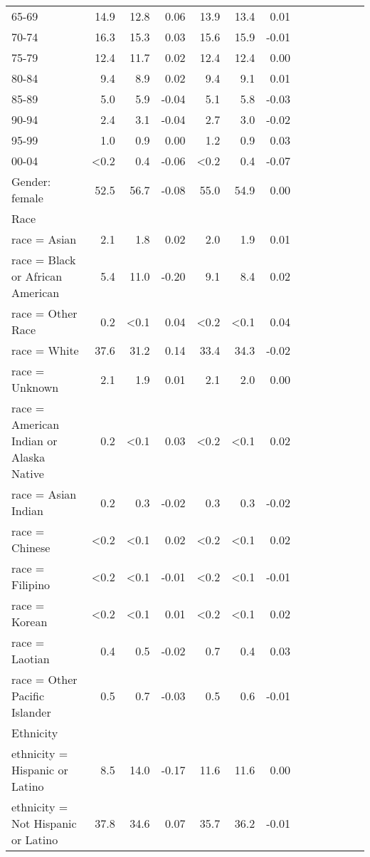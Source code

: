 \documentclass[11pt,]{article}
\begin{document}
\begin{longtable}{lrrrrrrrrrrrr}
      65-69 & 14.9 & 12.8 &  0.06 & 13.9 & 13.4 &  0.01 \\ 
      70-74 & 16.3 & 15.3 &  0.03 & 15.6 & 15.9 & -0.01 \\ 
      75-79 & 12.4 & 11.7 &  0.02 & 12.4 & 12.4 &  0.00 \\ 
      80-84 &  9.4 &  8.9 &  0.02 &  9.4 &  9.1 &  0.01 \\ 
      85-89 &  5.0 &  5.9 & -0.04 &  5.1 &  5.8 & -0.03 \\ 
      90-94 &  2.4 &  3.1 & -0.04 &  2.7 &  3.0 & -0.02 \\ 
      95-99 &  1.0 &  0.9 &  0.00 &  1.2 &  0.9 &  0.03 \\ 
      00-04 & <0.2 &  0.4 & -0.06 & <0.2 &  0.4 & -0.07 \\ 
  Gender: female & 52.5 & 56.7 & -0.08 & 55.0 & 54.9 &  0.00 \\ 
  Race &    &    &     &    &    &     \\ 
      race = Asian &  2.1 &  1.8 &  0.02 &  2.0 &  1.9 &  0.01 \\ 
      race = Black or African American &  5.4 & 11.0 & -0.20 &  9.1 &  8.4 &  0.02 \\ 
      race = Other Race &  0.2 & <0.1 &  0.04 & <0.2 & <0.1 &  0.04 \\ 
      race = White & 37.6 & 31.2 &  0.14 & 33.4 & 34.3 & -0.02 \\ 
      race = Unknown &  2.1 &  1.9 &  0.01 &  2.1 &  2.0 &  0.00 \\ 
      race = American Indian or Alaska Native &  0.2 & <0.1 &  0.03 & <0.2 & <0.1 &  0.02 \\ 
      race = Asian Indian &  0.2 &  0.3 & -0.02 &  0.3 &  0.3 & -0.02 \\ 
      race = Chinese & <0.2 & <0.1 &  0.02 & <0.2 & <0.1 &  0.02 \\ 
      race = Filipino & <0.2 & <0.1 & -0.01 & <0.2 & <0.1 & -0.01 \\ 
      race = Korean & <0.2 & <0.1 &  0.01 & <0.2 & <0.1 &  0.02 \\ 
      race = Laotian &  0.4 &  0.5 & -0.02 &  0.7 &  0.4 &  0.03 \\ 
      race = Other Pacific Islander &  0.5 &  0.7 & -0.03 &  0.5 &  0.6 & -0.01 \\ 
  Ethnicity &    &    &     &    &    &     \\ 
      ethnicity = Hispanic or Latino &  8.5 & 14.0 & -0.17 & 11.6 & 11.6 &  0.00 \\ 
      ethnicity = Not Hispanic or Latino & 37.8 & 34.6 &  0.07 & 35.7 & 36.2 & -0.01 \\ 

\end{longtable}
\end{document}
